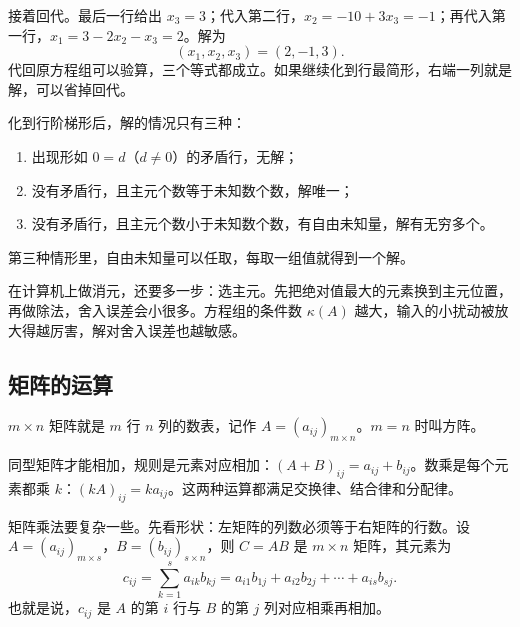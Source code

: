 接着回代。最后一行给出 \(x_3=3\)；代入第二行，\(x_2=-10+3x_3=-1\)；再代入第一行，\(x_1=3-2x_2-x_3=2\)。解为
\[
(x_1,x_2,x_3)=(2,-1,3).
\]
代回原方程组可以验算，三个等式都成立。如果继续化到行最简形，右端一列就是解，可以省掉回代。

化到行阶梯形后，解的情况只有三种：
\begin{enumerate}
\item 出现形如 \(0= d\)（\(d\ne 0\)）的矛盾行，无解；
\item 没有矛盾行，且主元个数等于未知数个数，解唯一；
\item 没有矛盾行，且主元个数小于未知数个数，有自由未知量，解有无穷多个。
\end{enumerate}
第三种情形里，自由未知量可以任取，每取一组值就得到一个解。

在计算机上做消元，还要多一步：选主元。先把绝对值最大的元素换到主元位置，再做除法，舍入误差会小很多。方程组的条件数 \(\kappa(A)\) 越大，输入的小扰动被放大得越厉害，解对舍入误差也越敏感。

\subsection{矩阵的运算}

\(m\times n\) 矩阵就是 \(m\) 行 \(n\) 列的数表，记作 \(A=(a_{ij})_{m\times n}\)。\(m=n\) 时叫方阵。

同型矩阵才能相加，规则是元素对应相加：\((A+B)_{ij}=a_{ij}+b_{ij}\)。数乘是每个元素都乘 \(k\)：\((kA)_{ij}=ka_{ij}\)。这两种运算都满足交换律、结合律和分配律。

矩阵乘法要复杂一些。先看形状：左矩阵的列数必须等于右矩阵的行数。设 \(A=(a_{ij})_{m\times s}\)，\(B=(b_{ij})_{s\times n}\)，则 \(C=AB\) 是 \(m\times n\) 矩阵，其元素为
\[
c_{ij}=\sum_{k=1}^{s}a_{ik}b_{kj}
=a_{i1}b_{1j}+a_{i2}b_{2j}+\cdots+a_{is}b_{sj}.
\]
也就是说，\(c_{ij}\) 是 \(A\) 的第 \(i\) 行与 \(B\) 的第 \(j\) 列对应相乘再相加。

